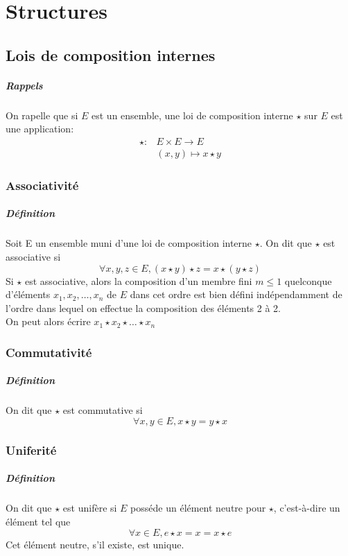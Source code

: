\chapter{Structures}
\section{Lois de composition internes}
\paragraph{Rappels} On rapelle que si $E$ est un ensemble, une loi de composition interne $\star$ sur $E$ est une application:
\begin{eqnarray*}
\star{}: & E \times E \rightarrow E \\
& (x, y) \mapsto x \star y
\end{eqnarray*}

%
\subsection{Associativité}
%
\paragraph{Définition} Soit E un ensemble muni d'une loi de composition interne $\star$. On dit que $\star$ est associative si
$$ \forall x, y, z \in E, (x \star y) \star z = x \star (y \star z)$$
Si $\star$ est associative, alors la composition d'un membre fini $m \leq 1$ quelconque d'éléments $x_1, x_2, \ldots , x_n$ de $E$ dans cet ordre est bien défini indépendamment de l'ordre dans lequel on effectue la composition des éléments 2 à 2. \\
On peut alors écrire $x_1 \star x_2 \star \ldots \star x_n$

%
\subsection{Commutativité}
%
\paragraph{Définition} On dit que $\star$ est commutative si
$$ \forall x, y \in E, x \star y = y \star x$$

%
\subsection{Uniferité}
%
\paragraph{Définition} On dit que $\star$ est unifère si $E$ posséde un élément neutre pour $\star$, c'est-à-dire un élément tel que
$$ \forall x \in E, e \star x = x = x \star e$$
Cet élément neutre, s'il existe, est unique.

